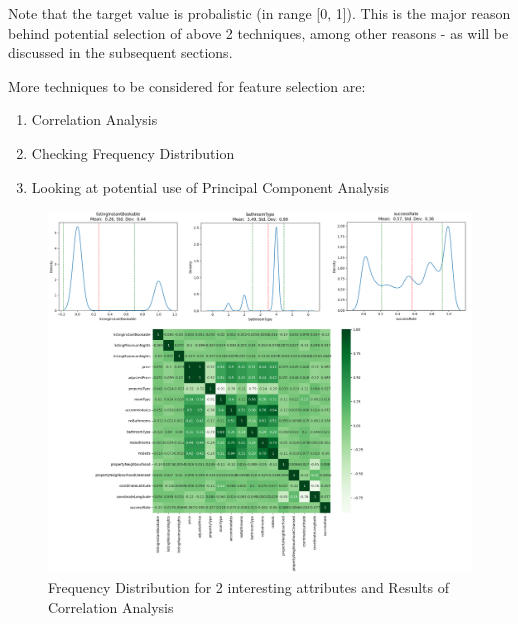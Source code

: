 \documentclass[conference]{IEEEtran}
\begin{document}
{	Note that the target value is probalistic (in range [0, 1]). This is the major reason behind potential selection of above 2 techniques, among other reasons - as will be discussed in the subsequent sections.

	More techniques to be considered for feature selection are:
	\begin{enumerate}
           	\item Correlation Analysis
		\item Checking Frequency Distribution
		\item Looking at potential use of Principal Component Analysis
	\end{enumerate}

   
     \begin{figure}[t]
       	\centering
	\includegraphics[width=1\textwidth]{../Data_Mining_Images/CorrelationAndFrequency.png}
	\caption{Frequency Distribution for 2 interesting attributes and Results of Correlation Analysis \cite{7_FeatureSelection}} \label{fig_7}
    \end{figure}
	
}
\end{document}
